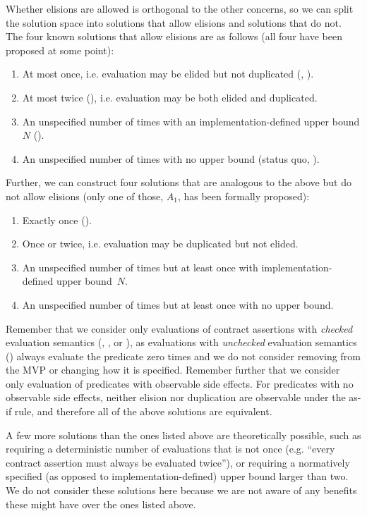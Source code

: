 Whether elisions are allowed is orthogonal to the other concerns, so we can split the solution space into solutions that allow elisions and solutions that do not. The four known solutions that allow elisions are as follows (all four have been proposed at some point):

\pagebreak %

\renewcommand{\theenumi}{$\Alph{enumi}_0$} \begin{enumerate}
\item At most once, i.e. evaluation may be elided but not duplicated (\cite{P1670R0}, \cite{D3197R0}).
\item At most twice (\cite{P2521R5}), i.e. evaluation may be both elided and duplicated.
\item An unspecified number of times with an implementation-defined upper bound $N$ (\cite{P3119R0}).
\item An unspecified number of times with no upper bound (status quo, \cite{P2900R6}).
\end{enumerate}
Further, we can construct four solutions that are analogous to the above but do not allow elisions (only one of those, $A_1$, has been formally proposed):
\renewcommand{\theenumi}{$\Alph{enumi}_1$} \begin{enumerate}
\item Exactly once (\cite{P2756R0}).
\item Once or twice, i.e. evaluation may be duplicated but not elided.
\item An unspecified number of times but at least once with implementation-defined upper \mbox{bound $N$}.
\item An unspecified number of times but at least once with no upper bound.
\end{enumerate}

 Remember that we consider only evaluations of contract assertions with \emph{checked} evaluation semantics (, , or ), as evaluations with \emph{unchecked} evaluation semantics () always evaluate the predicate zero times and we do not consider removing  from the MVP or changing how it is specified. Remember further that we consider only evaluation of predicates with observable side effects. For predicates with no observable side effects, neither elision nor duplication are observable under the as-if rule, and therefore all of the above solutions are equivalent. 

A few more solutions than the ones listed above are theoretically possible, such as requiring a deterministic number of evaluations that is not once (e.g. ``every contract assertion must always be evaluated twice''), or requiring a normatively specified (as opposed to implementation-defined) upper bound larger than two. We do not consider these solutions here because we are not aware of any benefits these might have over the ones listed above. 

